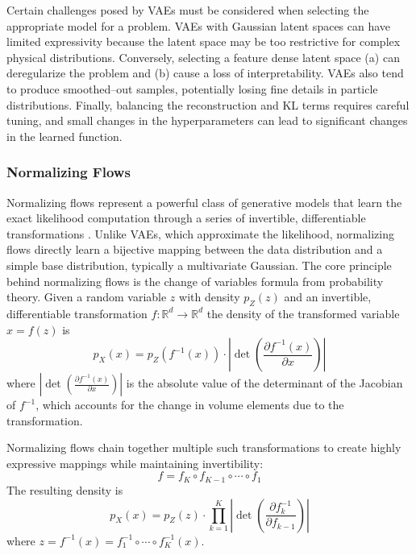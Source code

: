         Certain challenges posed by VAEs must be considered when selecting the appropriate model for a problem.
        VAEs with Gaussian latent spaces can have limited expressivity because the latent space may be too restrictive for complex physical distributions.
        Conversely, selecting a feature dense latent space (a) can deregularize the problem and (b) cause a loss of interpretability.
        VAEs also tend to produce smoothed--out samples, potentially losing fine details in particle distributions.
        Finally, balancing the reconstruction and KL terms requires careful tuning, and small changes in the hyperparameters can lead to significant changes in the learned function.

    \subsubsection{Normalizing Flows}
        Normalizing flows represent a powerful class of generative models that learn the exact likelihood computation through a series of invertible, differentiable transformations .
        Unlike VAEs, which approximate the likelihood, normalizing flows directly learn a bijective mapping between the data distribution and a simple base distribution, typically a multivariate Gaussian.
        The core principle behind normalizing flows is the change of variables formula from probability theory.
        Given a random variable \(z\) with density \(p_Z(z)\) and an invertible, differentiable transformation \(f:\mathbb{R}^d \rightarrow \mathbb{R}^d\) the density of the transformed variable \(x = f(z)\) is
        \begin{equation}
            p_X(x) = p_Z(f^{-1}(x)) \cdot \left|\det\left(\frac{\partial f^{-1}(x)}{\partial x}\right)\right|
        \end{equation}
        where \(\left|\det\left(\frac{\partial f^{-1}(x)}{\partial x}\right)\right|\) is the absolute value of the determinant of the Jacobian of \(f^{-1}\), which accounts for the change in volume elements due to the transformation.

        Normalizing flows chain together multiple such transformations to create highly expressive mappings while maintaining invertibility:
        \begin{equation}
            f = f_K \circ f_{K-1} \circ \cdots \circ f_1
        \end{equation}
        The resulting density is
        \begin{equation}
            p_X(x) = p_Z(z) \cdot \prod_{k=1}^{K} \left|\det\left(\frac{\partial f_k^{-1}}{\partial f_{k-1}}\right)\right|
        \end{equation}
        where \(z = f^{-1}(x) = f_1^{-1} \circ \cdots \circ f_K^{-1}(x)\).


